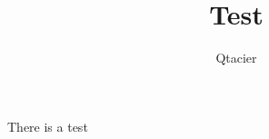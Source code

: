\documentclass{article}
\author{Qtacier}
\title{Test}
\begin{document}
\maketitle
 \centerline{There is a test}
\end{document}
